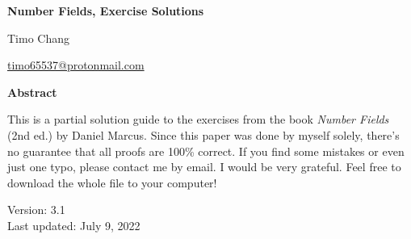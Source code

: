 \documentclass[11pt]{amsbook}
\makeatletter
\theoremstyle{plain}
\theoremstyle{definition}
\theoremstyle{remark}
\newcommand{\myToC}{{
  \renewcommand{\contentsname}{Contents}
  \@starttoc{toc}{\contentsname}
}}
\makeatother
\begin{document}
\begin{titlepage}
\begin{center}
\vspace*{1cm}

\LARGE
\textbf{Number Fields, Exercise Solutions}

\vspace{1.5cm}
\LARGE Timo Chang

\vspace{0.5cm}
\large \url{timo65537@protonmail.com}

\vspace{2cm}
\textbf{Abstract}
\vspace{0.3cm}
\end{center}

This is a partial solution guide to the exercises from the book \textit{Number Fields} (2nd ed.) by Daniel Marcus. Since this paper was done by myself solely, there's no guarantee that all proofs are 100\% correct. If you find some mistakes or even just one typo, please contact me by email. I would be very grateful. Feel free to download the whole file to your computer!

\begin{center}
\vfill

Version: 3.1 \\
Last updated: July 9, 2022
\end{center}

\end{titlepage}

\setcounter{tocdepth}{2}
\myToC





\end{document}
